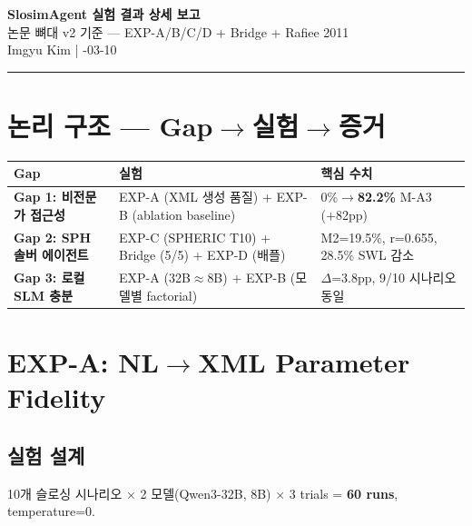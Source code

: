 \documentclass[10pt,a4paper]{article}
\begin{document}
\begin{center}
{\Large\bfseries SlosimAgent 실험 결과 상세 보고}\\[0.5em]
{\normalsize 논문 뼈대 v2 기준 — EXP-A/B/C/D + Bridge + Rafiee 2011}\\[0.3em]
{\small\color{gray} Imgyu Kim \quad | -03-10}
\end{center}

\vspace{0.3em}\hrule\vspace{0.8em}

\section{논리 구조 — Gap$\rightarrow$실험$\rightarrow$증거}

\begin{center}
\renewcommand{\arraystretch}{1.3}
\begin{tabular}{>{\bfseries}p{3.2cm}p{4.5cm}p{5.8cm}}
\toprule
Gap & 실험 & 핵심 수치 \\
\midrule
\cellcolor{lightgray}Gap 1: 비전문가 접근성 & EXP-A (XML 생성 품질) + EXP-B (ablation baseline) & 0\%$\rightarrow$\textbf{82.2\%} M-A3 (+82pp) \\
\cellcolor{lightgray}Gap 2: SPH 솔버 에이전트 & EXP-C (SPHERIC T10) + Bridge (5/5) + EXP-D (배플) & M2=19.5\%, r=0.655, 28.5\% SWL 감소 \\
\cellcolor{lightgray}Gap 3: 로컬 SLM 충분 & EXP-A (32B$\approx$8B) + EXP-B (모델별 factorial) & $\Delta$=3.8pp, 9/10 시나리오 동일 \\
\bottomrule
\end{tabular}
\end{center}

\section{EXP-A: NL$\rightarrow$XML Parameter Fidelity}

\subsection{실험 설계}

10개 슬로싱 시나리오 $\times$ 2 모델(Qwen3-32B, 8B) $\times$ 3 trials = \textbf{60 runs}, temperature=0.
\end{document}

